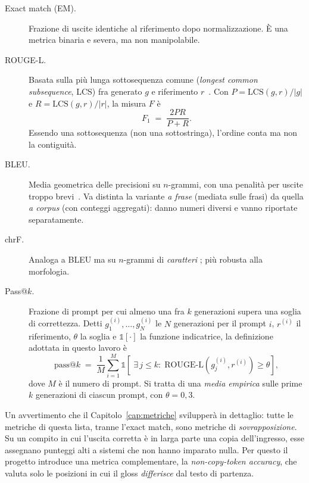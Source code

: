 \begin{description}
  \item[Exact match (EM).] Frazione di uscite identiche al riferimento dopo
        normalizzazione. È una metrica binaria e severa, ma non manipolabile.
  \item[ROUGE-L.] Basata sulla più lunga sottosequenza comune
        (\emph{longest common subsequence}, LCS) fra generato $g$ e riferimento
        $r$~\cite{lin2004rouge}. Con
        $P = \mathrm{LCS}(g,r)/|g|$ e $R = \mathrm{LCS}(g,r)/|r|$, la misura
        $F$ è
        \begin{equation}
          \label{eq:rouge}
          F_1 \;=\; \frac{2PR}{P+R}.
        \end{equation}
        Essendo una sottosequenza (non una sottostringa), l'ordine conta ma non
        la contiguità.
  \item[BLEU.] Media geometrica delle precisioni su $n$-grammi, con una
        penalità per uscite troppo brevi~\cite{papineni2002bleu}. Va distinta la
        variante \emph{a frase} (mediata sulle frasi) da quella \emph{a corpus}
        (con conteggi aggregati): danno numeri diversi e vanno riportate
        separatamente.
  \item[chrF.] Analoga a BLEU ma su $n$-grammi di \emph{caratteri}
        \cite{popovic2015chrf}; più robusta alla morfologia.
  \item[Pass@$k$.] Frazione di prompt per cui almeno una fra $k$ generazioni
        supera una soglia di correttezza. Detti $g^{(i)}_1, \dots, g^{(i)}_N$ le
        $N$ generazioni per il prompt $i$, $r^{(i)}$ il riferimento, $\theta$ la
        soglia e $\mathbb{1}[\cdot]$ la funzione indicatrice, la definizione
        adottata in questo lavoro è
        \begin{equation}
          \label{eq:passk}
          \mathrm{pass@}k
          \;=\;
          \frac{1}{M}\sum_{i=1}^{M}
          \mathbb{1}\!\left[\;\exists\, j \le k :\;
            \mathrm{ROUGE\text{-}L}\!\left(g^{(i)}_j, r^{(i)}\right) \ge \theta
          \right],
        \end{equation}
        dove $M$ è il numero di prompt. Si tratta di una \emph{media empirica}
        sulle prime $k$ generazioni di ciascun prompt, con $\theta = 0{,}3$.

\end{description}

Un avvertimento che il Capitolo~\ref{cap:metriche} svilupperà in dettaglio:
tutte le metriche di questa lista, tranne l'exact match, sono metriche di
\emph{sovrapposizione}. Su un compito in cui l'uscita corretta è in larga parte
una copia dell'ingresso, esse assegnano punteggi alti a sistemi che non hanno
imparato nulla. Per questo il progetto introduce una metrica complementare, la
\emph{non-copy-token accuracy}, che valuta solo le posizioni in cui il gloss
\emph{differisce} dal testo di partenza.

